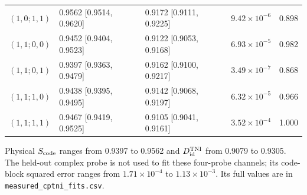 \documentclass[10pt,a4paper]{article}
\begin{document}
\begin{table}[htbp]
\begin{tabular}{llllr}
$(1,0;1,1)$ & 0.9562 [0.9514, 0.9620] & 0.9172 [0.9111, 0.9225] & $9.42\times10^{-6}$ & 0.898 \\
$(1,1;0,0)$ & 0.9452 [0.9404, 0.9523] & 0.9122 [0.9053, 0.9168] & $6.93\times10^{-5}$ & 0.982 \\
$(1,1;0,1)$ & 0.9397 [0.9363, 0.9479] & 0.9162 [0.9100, 0.9217] & $3.49\times10^{-7}$ & 0.868 \\
$(1,1;1,0)$ & 0.9438 [0.9395, 0.9495] & 0.9142 [0.9068, 0.9197] & $6.32\times10^{-5}$ & 0.966 \\
$(1,1;1,1)$ & 0.9467 [0.9419, 0.9525] & 0.9105 [0.9041, 0.9161] & $3.52\times10^{-4}$ & 1.000 \\
\bottomrule\end{tabular}\end{table}\par
Physical $S_{\rm code}$ ranges from 0.9397 to 0.9562 and $D_{\rm id}^{\rm TNI}$ from 0.9079 to 0.9305. The held-out complex probe is not used to fit these four-probe channels; its code-block squared error ranges from $1.71\times10^{-4}$ to $1.13\times10^{-3}$. Its full values are in \nolinkurl{measured_cptni_fits.csv}.\clearpage
\end{document}
